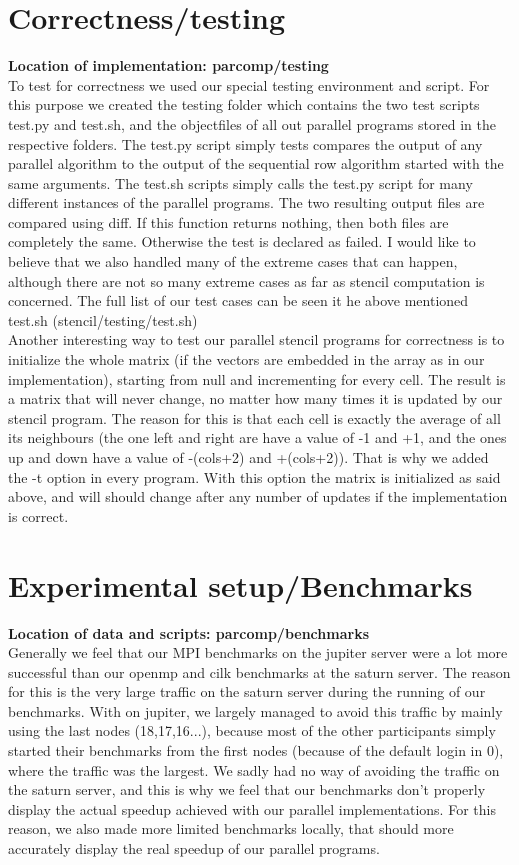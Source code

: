 \documentclass[11pt]{article}
\begin{document}
\section{Correctness/testing}
\textbf{Location of implementation: parcomp/testing}\\
To test for correctness we used our special testing environment and script. For this purpose we created the testing folder which contains
the two test scripts test.py and test.sh, and the objectfiles of all out parallel programs stored in the respective folders. The test.py script simply tests compares the output of
any parallel algorithm to the output of the sequential row algorithm started with the same arguments. The test.sh scripts simply calls the test.py script for many different instances of the
parallel programs. The two resulting output files are compared using diff. If this function returns nothing, then both files are completely the same. Otherwise the test is declared as failed. 
I would like to believe that we also handled many of the extreme cases that can happen, although there are not so many extreme cases as far as stencil computation is concerned. The full list of
our test cases can be seen it he above mentioned test.sh (stencil/testing/test.sh)\\
Another interesting way to test our parallel stencil programs for correctness is to initialize the whole matrix (if the vectors are embedded in the array as in our implementation), starting from null
and incrementing for every cell. The result is a matrix that will never change, no matter how many times it is updated by our stencil program. The reason for this is that each cell is exactly the average
of all its neighbours (the one left and right are have a value of -1 and +1, and the ones up and down have a value of -(cols+2) and +(cols+2)). That is why we added the -t option in every program. With this option the
matrix is initialized as said above, and will should change after any number of updates if the implementation is correct.

\section{Experimental setup/Benchmarks}
\textbf{Location of data and scripts: parcomp/benchmarks}\\
Generally we feel that our MPI benchmarks on the jupiter server were a lot more successful than our openmp and cilk benchmarks at the saturn server. The reason for this is the very large traffic on the saturn server during
the running of our benchmarks. With on jupiter, we largely managed to avoid this traffic by mainly using the last nodes (18,17,16...), because most of the other participants simply started their benchmarks from the first nodes (because of the default login in 0), where the
traffic was the largest. We sadly had no way of avoiding the traffic on the saturn server, and this is why we feel that our benchmarks don't properly display the actual speedup achieved with our parallel implementations. For this reason, we also made more limited benchmarks locally,
that should more accurately display the real speedup of our parallel programs.\\
\end{document}
